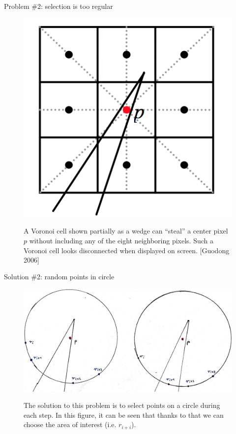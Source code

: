 \documentclass[aspectratio=169, 22pt]{beamer}
\begin{document}
\begin{frame}{Problem \#2: selection is too regular}

\begin{figure}
\centering
\includegraphics[width=0.40\linewidth]{./problem_2.png}
\label{fig:test}
\caption{A Voronoi cell shown partially as a wedge can ``steal'' a center
pixel $p$ without including any of the eight neighboring pixels. Such a
	Voronoi cell looks disconnected when displayed on screen. [Guodong 2006]}
\end{figure}

\end{frame}


\begin{frame}{Solution \#2: random points in circle}


\begin{figure}
\centering
\includegraphics[width=0.82\linewidth]{./circle_random.jpg}
\label{fig:test}
\caption{The solution to this problem is to select points on a circle during
	each step. In this figure, it can be seen that thanks to that we can choose
	the area of interest (i.e. $r_{i+i}$).}
\end{figure}

\end{frame}

\end{document}
